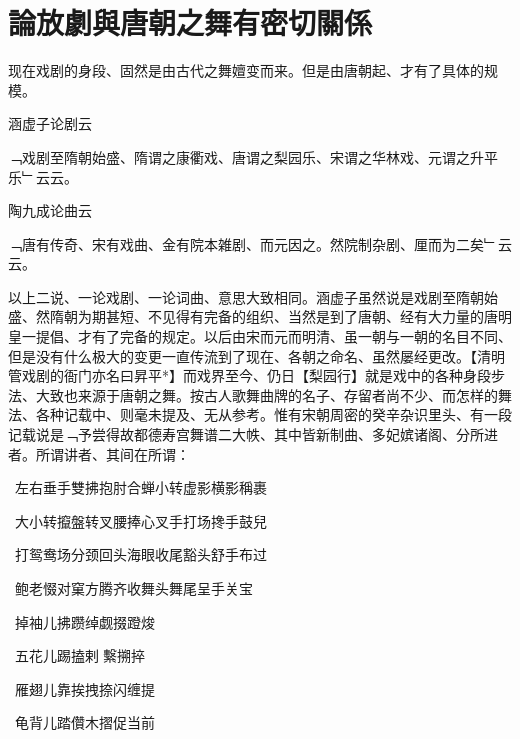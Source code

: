 \chapter*[第二章]{論放劇與唐朝之舞有密切關係}{}   

现在戏剧的身段、固然是由古代之舞嬗变而来。但是由唐朝起、才有了具体的规模。

涵虚子论剧云
\begin{preface}

﹁戏剧至隋朝始盛、隋谓之康衢戏、唐谓之梨园乐、宋谓之华林戏、元谓之升平乐﹂云云。

\end{preface}

陶九成论曲云

\begin{preface}

﹁唐有传奇、宋有戏曲、金有院本雑剧、而元因之。然院制杂剧、厘而为二矣﹂云云。

\end{preface}

以上二说、一论戏剧、一论词曲、意思大致相同。涵虚子虽然说是戏剧至隋朝始盛、然隋朝为期甚短、不见得有完备的组织、当然是到了唐朝、经有大力量的唐明皇一提倡、才有了完备的规定。以后由宋而元而明清、虽一朝与一朝的名目不同、但是没有什么极大的变更一直传流到了现在、各朝之命名、虽然屡经更改。【清明管戏剧的衙门亦名曰昇平*】而戏界至今、仍日【梨园行】就是戏中的各种身段步法、大致也来源于唐朝之舞。按古人歌舞曲牌的名子、存留者尚不少、而怎样的舞法、各种记载中、则毫未提及、无从参考。惟有宋朝周密的癸辛杂识里头、有一段记载说是﹁予尝得故都德寿宫舞谱二大帙、其中皆新制曲、多妃嫔诸阁、分所进者。所谓讲者、其间在所谓：

~左右垂手\quad 雙拂\quad 抱肘\quad 合蝉\quad 小转\quad 虚影\quad 横影\quad 稱裹 

~大小转攛\quad 盤转\quad 叉腰\quad 捧心\quad 叉手\quad 打场\quad 搀手\quad 鼓兒

~打鸳鸯场\quad 分颈\quad 回头\quad 海眼\quad 收尾\quad 豁头\quad 舒手\quad 布过

~鲍老惙\quad  对窠\quad  方腾\quad  齐收\quad  舞头\quad  舞尾\quad  呈手\quad  关宝


~掉袖儿\quad  拂\quad  躜\quad  绰\quad  觑\quad  掇\quad  蹬\quad  焌


~五花儿\quad  踢\quad  搕\quad  剌\quad  𭣇\quad  繫\quad  搠\quad  捽


~雁翅儿\quad  靠\quad  挨\quad  拽\quad  捺\quad  闪\quad  缠\quad  提


~龟背儿\quad  踏\quad  儹\quad  木\quad  摺\quad  促\quad  当\quad  前


